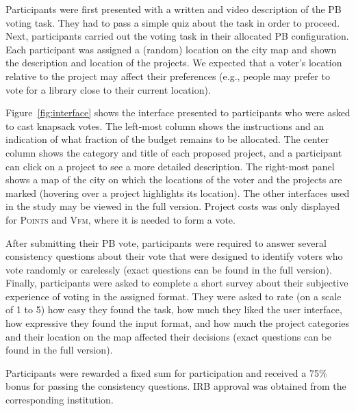\documentclass[twoside,11pt]{article}
\newcommand{\points}{\textsc{Points}}
\newcommand{\vfm}{\textsc{Vfm}}
\newcommand{\knap}{\textsc{Knap}}
\begin{document}
 \begin{figure*}[h]
\begin{center}
\caption{The GUI shown to participants using the \knap{}  input format (center), showing  the city map (right) and budget (left).
}\label{fig:interface}
\end{center}
\end{figure*}
 
Participants were first presented with a written and video description of the PB voting task. They had to pass a simple quiz about the task in order to proceed. 
Next, participants carried out the voting task 
in their allocated PB configuration.
Each participant was assigned a  (random) location on the city map and   shown the description and location of the projects. 
We expected that a voter's location relative to  the project may affect their   preferences (e.g., people may prefer to vote for a library  close to their current location). 
  

 Figure~\ref{fig:interface} shows the interface  presented to participants who were asked to cast knapsack votes. 
 The left-most column shows the instructions and an indication of what fraction of the budget remains to be allocated. The center column shows the category and title of each proposed project, and a participant can click on a project to see a more detailed description. The right-most panel shows a map of the city on which the locations of the voter and the projects are marked (hovering over a project highlights its location). The other interfaces used in the study may be viewed in the full version. Project costs was only displayed for \points{} and \vfm{}, where it is needed to form a vote. 
 
 After   submitting their PB vote, participants were required to answer several consistency questions about their vote that were  designed to identify voters who vote randomly or carelessly (exact questions can be found in the full version).  Finally, participants were asked to complete a short survey about their subjective experience of voting in the assigned format. They were asked to rate (on a scale of 1 to 5) how easy they found the task, how much they liked the user interface,   how   expressive  they found the input format,  and how much the project categories and their location on the map    affected their decisions (exact questions can be found in the full version). 
 
 Participants were rewarded a  fixed sum    for participation and  received a 75\% bonus for passing the  consistency questions. 
 IRB approval was obtained from the corresponding institution. 
\end{document}

